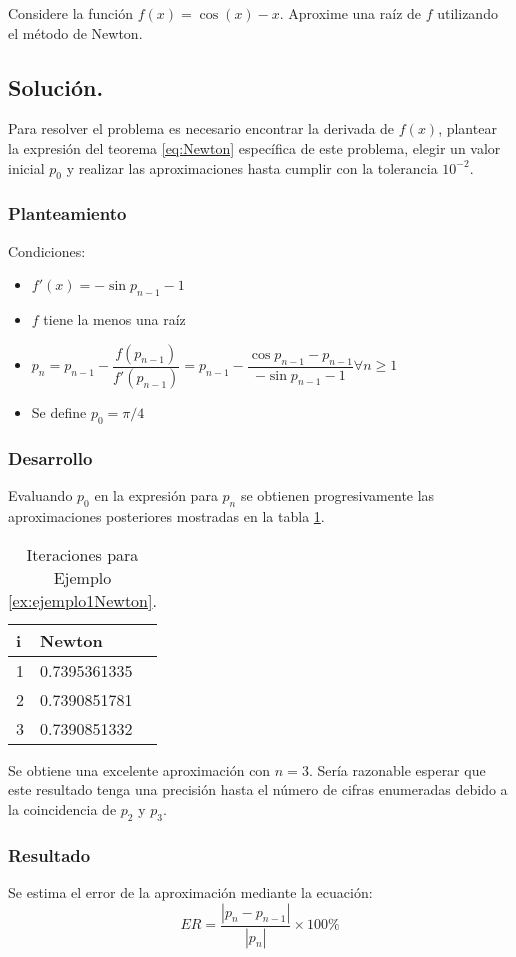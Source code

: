 \begin{exerciseT}
Considere la función $f(x)= \cos (x) - x$. Aproxime una raíz de $f$ utilizando el método de Newton.

\subsection*{Solución.} 
Para resolver el problema es necesario encontrar la derivada de $f(x)$, plantear la expresión del teorema \ref{eq:Newton}
específica de este problema, elegir un valor inicial $p_0$ y realizar las aproximaciones hasta cumplir con 
la tolerancia $10^{-2}$.
\subsubsection*{Planteamiento}
Condiciones:
\begin{itemize}
	\item $f'(x) = {-\sin p_{n-1} -1 }$
	\item $f$ tiene la menos una raíz	
	\item $p_{n} = p_{n-1} - \dfrac{f(p_{n-1})}{f'(p_{n-1})} = p_{n-1} - \dfrac{\cos p_{n-1} - p_{n-1}}{-\sin p_{n-1} -1} \forall n\geq 1$
	\item Se define $p_{0}=\pi/4$
\end{itemize}

\subsubsection*{Desarrollo}
Evaluando $p_0$ en la expresión para $p_n$ se obtienen progresivamente las aproximaciones posteriores mostradas en 
la tabla \ref{table:ejemplo1Newton}.
\begin{table}[H]
	\centering
    \begin{tabular}{lll}
    	\toprule
    	i & Newton\\\midrule
		1 & 0.7395361335\\
		2 & 0.7390851781\\
		3 & 0.7390851332\\
		\bottomrule
	\end{tabular}
    \caption{Iteraciones para Ejemplo \ref{ex:ejemplo1Newton}.}
	\label{table:ejemplo1Newton}
\end{table}
Se obtiene una excelente aproximación con $n=3$. Sería razonable esperar que este resultado
tenga una precisión hasta el número de cifras enumeradas debido a la coincidencia de $p_{2}$ y $p_3$.

\subsubsection*{Resultado}
Se estima el error de la aproximación mediante 	la ecuación:
\[ ER = \dfrac{|p_n-p_{n-1}|}{|p_n|}\times 100\% \]


\end{exerciseT}
